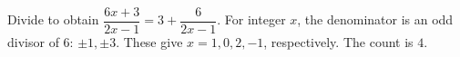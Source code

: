 Divide to obtain $\dfrac{6x+3}{2x-1}=3+\dfrac{6}{2x-1}$. For integer $x$, the denominator is an odd divisor of 6: $\pm1,\pm3$. These give $x=1,0,2,-1$, respectively. The count is $\boxed4$.
